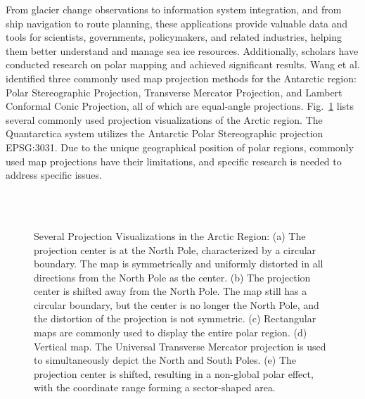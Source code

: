 From glacier change observations to information system integration, and from ship navigation to route planning, these applications provide valuable data and tools for scientists, governments, policymakers, and related industries, helping them better understand and manage sea ice resources. Additionally, scholars have conducted research on polar mapping and achieved significant results. Wang et al. \cite{189qinghua2002} identified three commonly used map projection methods for the Antarctic region: Polar Stereographic Projection, Transverse Mercator Projection, and Lambert Conformal Conic Projection, all of which are equal-angle projections. Fig.~\ref{fig15} lists several commonly used projection visualizations of the Arctic region. The Quantarctica system utilizes the Antarctic Polar Stereographic projection EPSG:3031. Due to the unique geographical position of polar regions, commonly used map projections have their limitations, and specific research is needed to address specific issues.

\begin{figure}[!tbh] 
    \centering
    \label{1a}
    \label{1b}\\
    \label{1c}
     \label{1d}\\
        \label{1e}
        
	  \caption{Several Projection Visualizations in the Arctic Region:
(a) The projection center is at the North Pole, characterized by a circular boundary. The map is symmetrically and uniformly distorted in all directions from the North Pole as the center.
(b) The projection center is shifted away from the North Pole. The map still has a circular boundary, but the center is no longer the North Pole, and the distortion of the projection is not symmetric.
(c) Rectangular maps are commonly used to display the entire polar region.
(d) Vertical map. The Universal Transverse Mercator projection is used to simultaneously depict the North and South Poles.
(e) The projection center is shifted, resulting in a non-global polar effect, with the coordinate range forming a sector-shaped area.}
	  \label{fig15} 
\end{figure}

